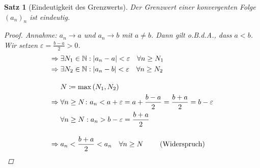 \documentclass[11pt, twoside, a4paper]{article}
\theoremstyle{plain}
\newtheorem{satz}[blockelement]{Satz}
\newcommand{\pair}[1]{\left(#1\right)}
\newcommand{\abs}[1]{\left|#1\right|}
\newcommand{\impl}[0]{\Rightarrow{}}
\newcommand{\definedas}[0]{\coloneqq}
\newcommand{\OBDA}{o.B.d.A.}
\newcommand{\fromto}{\rightarrow{}}
\newcommand{\naturalnumbers}{\mathbb{N}}
\begin{document}
    \begin{satz}[Eindeutigkeit des Grenzwerts]
        Der Grenzwert einer konvergenten Folge $(a_n)_n$ ist eindeutig.
        \begin{proof}
            Annahme: $a_n\fromto a$ und $a_n\fromto b$ mit  $a\neq b$. Dann gilt \OBDA, dass $a<b$.\\
            Wir setzen $\varepsilon = \frac{b-a}{2} > 0$.
            \begin{align*}
                \impl &\exists N_1 \in\naturalnumbers: \abs{a_n-a} < \varepsilon \quad \forall n\geq N_1\\
                \impl &\exists N_2 \in\naturalnumbers: \abs{a_n-b} < \varepsilon \quad \forall n\geq N_2\\[10pt]
                &N\definedas \max\pair{N_1, N_2}\\
                \impl &\forall n\geq N\colon a_n < a+\varepsilon = a + \frac{b-a}{2} = \frac{b+a}{2} = b-\varepsilon\\
                &\forall n\geq N: a_n > b-\varepsilon = \frac{b+a}{2}\\[10pt]
                \impl &a_n <\frac{b+a}{2} < a_n \quad \forall n\geq N\qquad\text{ (Widerspruch)}\qedhere
            \end{align*}
        \end{proof}
    \end{satz}
\end{document}

